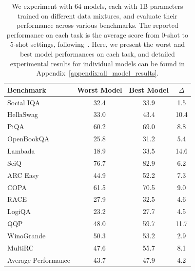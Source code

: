\begin{table}[t]
    \centering
    \small
    \caption{We experiment with 64 models, each with 1B parameters trained on different data mixtures, and evaluate their performance across various benchmarks. The reported performance on each task is the average score from 0-shot to 5-shot settings, following~\citet{muennighoff2023scaling}. Here, we present the worst and best model performances on each task, and detailed experimental results for individual models can be found in Appendix~\ref{appendix:all_model_results}.}
    \vspace{1mm}
    \label{tab:worst_best_model_perf}
    \begin{tabular}{l|ccc}
    \toprule
     \textbf{Benchmark} & \textbf{Worst Model} & \textbf{Best Model} & $\Delta$ \\
     \midrule
        Social IQA~\citep{sap2019socialiqa} & 32.4 & 33.9 & 1.5 \\
        HellaSwag~\citep{zellers2019hellaswag} & 33.0 & 43.4 & 10.4 \\
        PiQA~\citep{bisk2020piqa} & 60.2 & 69.0 & 8.8 \\
        OpenBookQA~\citep{mihaylov2018can} & 25.8 & 31.2 & 5.4 \\
        Lambada~\citep{paperno2016lambada} & 18.9 & 33.5 & 14.6 \\
        SciQ~\citep{welbl2017crowdsourcing} & 76.7 & 82.9 & 6.2 \\
        ARC Easy~\citep{clark2018think} & 44.9 & 52.2 & 7.3 \\
        COPA~\citep{sarlin2020superglue}  & 61.5 & 70.5 & 9.0 \\
        RACE~\citep{lai2017race}  & 27.9 & 32.5 & 4.6 \\
        LogiQA~\citep{liu2020logiqa}  & 23.2 & 27.7 & 4.5 \\
        QQP~\citep{wang2018glue}  & 48.0 & 59.7 & 11.7 \\
        WinoGrande~\citep{sakaguchi2021winogrande} & 50.3 & 53.2 & 2.9 \\
        MultiRC~\citep{khashabi2018looking} & 47.6 & 55.7 & 8.1 \\
        \midrule
        Average Performance & 43.7 & 47.9 & 4.2 \\
    \bottomrule
    \end{tabular}
\end{table}

